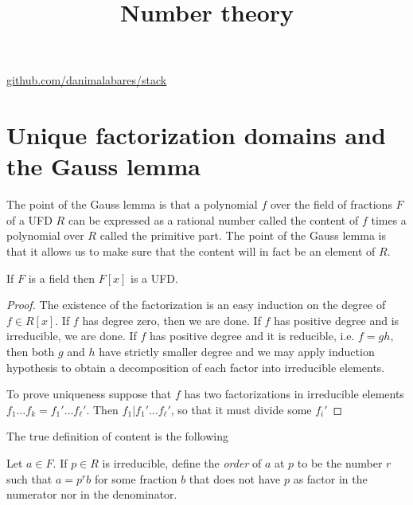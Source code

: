 



\title{Number theory}
\maketitle

\label{section-phantom}
\hfill
\href{http://github.com/danimalabares/stack}{github.com/danimalabares/stack}

\tableofcontents




\section{Unique factorization domains and the Gauss lemma}
\label{section-UFD}

The point of the Gauss lemma is that a polynomial $f$ over the field of fractions
$F$ of a UFD $R$ can be expressed as a rational number called the content of $f$
times a polynomial over $R$ called the primitive part. The point of the Gauss
lemma is that it allows us to make sure that the content will in fact be an
element of $R$.

\medskip\noindent
\begin{lemma}
\label{lemma-polynomials-over-fields-are-UFD}
If $F$ is a field then $F[x]$ is a UFD.
\end{lemma}

\begin{proof}
The existence of the factorization is an easy induction on the degree of $f\in
R[x]$. If $f$ has degree zero, then we are done. If $f$ has positive degree and
is irreducible, we are done. If $f$ has positive degree and it is reducible,
i.e. $f=gh$, then both $g$ and $h$ have strictly smaller degree and we may apply
induction hypothesis to obtain a decomposition of each factor into irreducible
elements.

To prove uniqueness suppose that $f$ has two factorizations in irreducible
elements  $f_1\ldots f_k=f_1'\ldots f_\ell'$. Then $f_1|f_1'\ldots f_\ell'$, so
that it must divide some $f_i'$ 
\end{proof}

The true definition of content is the following

\begin{definition}
\label{definition-order-of-fraction}
Let $a \in F$. If $p \in R$ is irreducible, define the {\it order} of $a$ at $p$
to be the number $r$ such that $a=p^rb$ for some fraction $b$ that does not have
$p$ as factor in the numerator nor in the denominator.
\end{definition}


